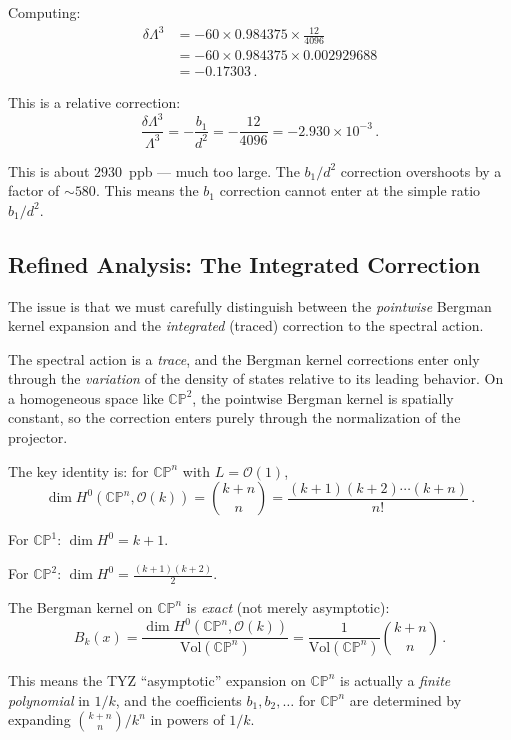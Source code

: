\documentclass[12pt,a4paper]{article}
\theoremstyle{definition}
\theoremstyle{remark}
\newcommand{\CP}{\mathbb{CP}}
\begin{document}
Computing:
\begin{align}
\delta\Lambda^3
&= -60 \times 0.984375 \times \frac{12}{4096} \nonumber\\
&= -60 \times 0.984375 \times 0.002929688 \nonumber\\
&= -0.17303\,.
\end{align}

This is a relative correction:
\begin{equation}
\frac{\delta\Lambda^3}{\Lambda^3}
= -\frac{b_1}{d^2}
= -\frac{12}{4096}
= -2.930 \times 10^{-3}\,.
\end{equation}

This is about $2930$~ppb --- much too large. The $b_1/d^2$ correction
overshoots by a factor of $\sim 580$. This means the $b_1$ correction
cannot enter at the simple ratio $b_1/d^2$.

\subsection{Refined Analysis: The Integrated Correction}

The issue is that we must carefully distinguish between the \emph{pointwise}
Bergman kernel expansion and the \emph{integrated} (traced) correction to
the spectral action.

The spectral action is a \emph{trace}, and the Bergman kernel corrections
enter only through the \emph{variation} of the density of states relative to
its leading behavior. On a homogeneous space like $\CP^2$, the pointwise
Bergman kernel is spatially constant, so the correction enters purely through
the normalization of the projector.

The key identity is: for $\CP^n$ with $L = \mathcal{O}(1)$,
\begin{equation}
\dim H^0(\CP^n, \mathcal{O}(k)) = \binom{k+n}{n}
= \frac{(k+1)(k+2)\cdots(k+n)}{n!}\,.
\end{equation}

For $\CP^1$: $\dim H^0 = k + 1$.

For $\CP^2$: $\dim H^0 = \frac{(k+1)(k+2)}{2}$.

The Bergman kernel on $\CP^n$ is \emph{exact} (not merely asymptotic):
\begin{equation}
B_k(x) = \frac{\dim H^0(\CP^n, \mathcal{O}(k))}{\mathrm{Vol}(\CP^n)}
= \frac{1}{\mathrm{Vol}(\CP^n)}\binom{k+n}{n}\,.
\end{equation}

This means the TYZ ``asymptotic'' expansion on $\CP^n$ is actually a
\emph{finite polynomial} in $1/k$, and the coefficients $b_1, b_2, \ldots$
for $\CP^n$ are determined by expanding $\binom{k+n}{n}/k^n$ in powers
of $1/k$.
\end{document}

